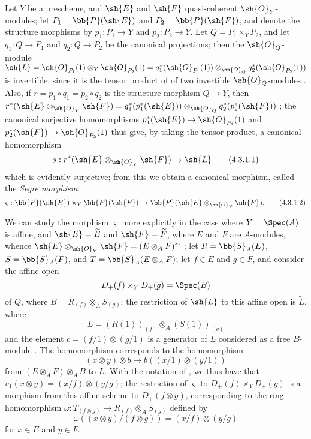 \begin{env}[4.3.1]
\label{II.4.3.1}
Let $Y$ be a prescheme, and $\sh{E}$ and $\sh{F}$ quasi-coherent $\sh{O}_Y$-modules;
let $P_1=\bb{P}(\sh{E})$ and $P_2=\bb{P}(\sh{F})$, and denote the structure morphisms by $p_1:P_1\to Y$ and $p_2:P_2\to Y$.
Let $Q=P_1\times_Y P_2$, and let $q_1:Q\to P_1$ and $q_2:Q\to P_2$ be the canonical projections;
then the $\sh{O}_Q$-module $\sh{L}=\sh{O}_{P_1}(1)\otimes_Y \sh{O}_{P_2}(1) = q_1^*(\sh{O}_{P_1}(1))\otimes_{\sh{O}_Q}q_2^*(\sh{O}_{P_2}(1))$ is invertible, since it is the tensor product of of two invertible $\sh{O}_Q$-modules .
Also, if $r=p_1\circ q_1=p_2\circ q_2$ is the structure morphism $Q\to Y$, then $r^*(\sh{E}\otimes_{\sh{O}_Y}\sh{F}) = q_1^*(p_1^*(\sh{E}))\otimes_{\sh{O}_Q}q_2^*(p_2^*(\sh{F}))$ ;
the canonical surjective homomorphisms  $p_1^*(\sh{E})\to\sh{O}_{P_1}(1)$ and $p_2^*(\sh{F})\to\sh{O}_{P_2}(1)$ thus give, by taking the tensor product, a canonical homomorphism
\[
\label{II.4.3.1.1}
  s: r^*(\sh{E}\otimes_{\sh{O}_Y}\sh{F}) \to \sh{L}
  \tag{4.3.1.1}
\]
which is evidently surjective;
from this we obtain  a canonical morphism, called the \emph{Segre morphism}:
\[
\label{II.4.3.1.2}
  \varsigma: \bb{P}(\sh{E})\times_Y\bb{P}(\sh{F}) \to \bb{P}(\sh{E}\otimes_{\sh{O}_Y}\sh{F}).
  \tag{4.3.1.2}
\]

We can study the morphism $\varsigma$ more explicitly in the case where $Y=\Spec(A)$ is affine, and $\sh{E}=\widetilde{E}$ and $\sh{F}=\widetilde{F}$, where $E$ and $F$ are $A$-modules, whence $\sh{E}\otimes_{\sh{O}_Y}\sh{F}=(E\otimes_A F)^\sim$ ;
let $R=\bb{S}_A(E)$, $S=\bb{S}_A(F)$, and $T=\bb{S}_A(E\otimes_A F)$;
let $f\in E$ and $g\in F$, and consider the affine open
\[
  D_+(f) \times_Y D_+(g) = \Spec(B)
\]
of $Q$, where $B=R_{(f)}\otimes_A S_{(g)}$;
the restriction of $\sh{L}$ to this affine open is $\widetilde{L}$, where
\[
  L = (R(1))_{(f)} \otimes_A (S(1))_{(g)}
\]
and the element $c=(f/1)\otimes(g/1)$ is a generator of $L$ considered as a free $B$-module .
The homomorphism  corresponds to the homomorphism
\[
  (x\otimes y)\otimes b \mapsto b((x/1)\otimes(y/1))
\]
from $(E\otimes_A F)\otimes_A B$ to $L$.
With the notation of , we thus have that $v_1(x\otimes y)=(x/f)\otimes(y/g)$;
the restriction of $\varsigma$ to $D_+(f)\times_Y D_+(g)$ is a morphism from this affine scheme to $D_+(f\otimes g)$, corresponding to the ring homomorphism $\omega:T_{(f\otimes g)}\to R_{(f)}\otimes_A S_{(g)}$ defined by
\[
\label{II.4.3.1.3}
  \omega((x\otimes y)/(f\otimes g)) = (x/f)\otimes(y/g)
  \tag{4.3.1.3}
\]
for $x\in E$ and $y\in F$.
\end{env}


